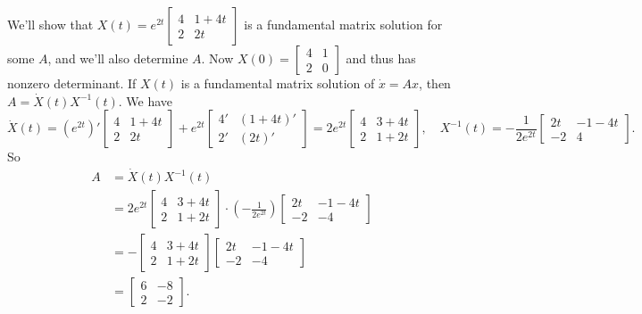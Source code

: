\begin{example}
    We'll show that $X(t)=e^{2t}
    \begin{bmatrix}
        4 & 1+4t\\ 2 & 2t
    \end{bmatrix}$ is a fundamental matrix solution for some $A$, and we'll also determine $A$. Now $X(0)=
    \begin{bmatrix}
        4 & 1 \\ 2 & 0
        \end{bmatrix}$ and thus has nonzero determinant. If $X(t)$ is a fundamental matrix solution of $\dot x=Ax$, then $A=\dot X(t)X^{-1}(t)$. We have\[
    \dot X(t)=\left( e^{2t} \right) '
    \begin{bmatrix}
        4 & 1+4t \\ 2 & 2t
    \end{bmatrix}+ e^{2t}
    \begin{bmatrix}
        4' & (1+4t)'\\2' & (2t)'
    \end{bmatrix}=2e^{2t}
    \begin{bmatrix}
        4 & 3+4t\\
        2 & 1+2t
    \end{bmatrix},\quad X^{-1}(t)=-\frac{1}{2e^{2t}}
    \begin{bmatrix}
        2t & -1-4t\\-2 & 4
    \end{bmatrix}.
    \] 
So 
\begin{align*}
    A&=\dot X(t)X^{-1}(t)\\
     &=2e^{2t}
    \begin{bmatrix}
        4 & 3+4t\\
        2 & 1+2t
    \end{bmatrix}\cdot \left(- \frac{1}{2e^{2t}} \right) 
    \begin{bmatrix}
        2t & -1-4t \\ -2 & -4
    \end{bmatrix}\\
     &=-\begin{bmatrix}
        4 & 3+4t\\
        2 & 1+2t
    \end{bmatrix}
    \begin{bmatrix}
        2t & -1-4t \\ -2 & -4
    \end{bmatrix}\\
     &=
     \begin{bmatrix}
         6 & -8\\
         2 & -2
     \end{bmatrix}.
\end{align*}
\end{example}

